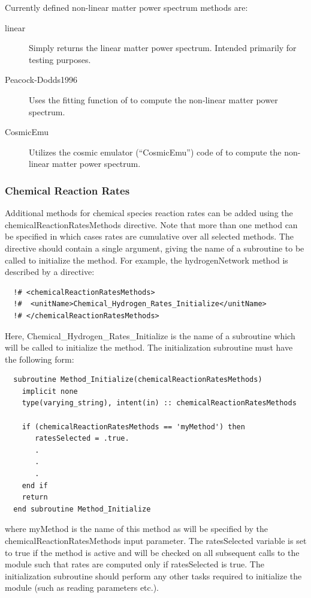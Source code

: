 Currently defined non-linear matter power spectrum methods are:
\begin{description}
 \item [{\normalfont \ttfamily linear}] Simply returns the linear matter power spectrum. Intended primarily for testing purposes.
 \item [{\normalfont \ttfamily Peacock-Dodds1996}] Uses the fitting function of \cite{peacock_non-linear_1996} to compute the non-linear matter power spectrum.
 \item [{\normalfont \ttfamily CosmicEmu}] Utilizes the cosmic emulator (``CosmicEmu'') code of \cite{lawrence_coyote_2010} to compute the non-linear matter power spectrum.
\end{description}

\subsubsection{Chemical Reaction Rates}

Additional methods for chemical species reaction rates can be added using the {\normalfont \ttfamily chemicalReactionRatesMethods} directive. Note that more than one method can be specified in which cases rates are cumulative over all selected methods. The directive should contain a single argument, giving the name of a subroutine to be called to initialize the method. For example, the {\normalfont \ttfamily hydrogenNetwork} method is described by a directive:
\begin{verbatim}
  !# <chemicalReactionRatesMethods>
  !#  <unitName>Chemical_Hydrogen_Rates_Initialize</unitName>
  !# </chemicalReactionRatesMethods>
\end{verbatim}
Here, {\normalfont \ttfamily Chemical\_Hydrogen\_Rates\_Initialize} is the name of a subroutine which will be called to initialize the method. The initialization subroutine must have the following form:
\begin{verbatim}
  subroutine Method_Initialize(chemicalReactionRatesMethods)
    implicit none
    type(varying_string), intent(in) :: chemicalReactionRatesMethods
    
    if (chemicalReactionRatesMethods == 'myMethod') then
       ratesSelected = .true.
       .
       .
       .
    end if
    return
  end subroutine Method_Initialize
\end{verbatim}
where {\normalfont \ttfamily myMethod} is the name of this method as will be specified by the {\normalfont \ttfamily chemicalReactionRatesMethods} input parameter. The {\normalfont \ttfamily ratesSelected} variable is set to true if the method is active and will be checked on all subsequent calls to the module such that rates are computed only if {\normalfont \ttfamily ratesSelected} is true. The initialization subroutine should perform any other tasks required to initialize the module (such as reading parameters etc.).

